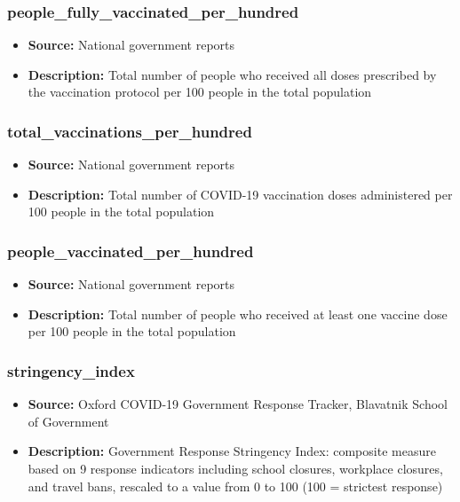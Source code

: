 \documentclass{article}
\begin{document}
\begin{multicols}{2}
\subsubsection{people\_fully\_vaccinated\_per\_hundred}
\begin{itemize}
    \item \textbf{Source:} National government reports
    \item \textbf{Description:} Total number of people who received all doses prescribed by the vaccination protocol per 100 people in the total population
\end{itemize}

\subsubsection{total\_vaccinations\_per\_hundred}
\begin{itemize}
    \item \textbf{Source:} National government reports
    \item \textbf{Description:} Total number of COVID-19 vaccination doses administered per 100 people in the total population
\end{itemize}

\subsubsection{people\_vaccinated\_per\_hundred}
\begin{itemize}
    \item \textbf{Source:} National government reports
    \item \textbf{Description:} Total number of people who received at least one vaccine dose per 100 people in the total population
\end{itemize}

\subsubsection{stringency\_index}
\begin{itemize}
    \item \textbf{Source:} Oxford COVID-19 Government Response Tracker, Blavatnik School of Government
    \item \textbf{Description:} Government Response Stringency Index: composite measure based on 9 response indicators including school closures, workplace closures, and travel bans, rescaled to a value from 0 to 100 (100 = strictest response)
\end{itemize}


\end{multicols}
\end{document}
